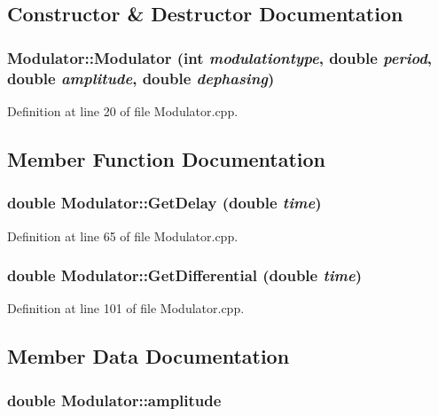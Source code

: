 \subsection{Constructor \& Destructor Documentation}
\hypertarget{classModulator_a9988f2b9041384d86b58fd8ff6a2ab30}{
\subsubsection[{Modulator}]{\setlength{\rightskip}{0pt plus 5cm}Modulator::Modulator (int {\em modulationtype}, \/  double {\em period}, \/  double {\em amplitude}, \/  double {\em dephasing})}}
\label{classModulator_a9988f2b9041384d86b58fd8ff6a2ab30}


Definition at line 20 of file Modulator.cpp.



\subsection{Member Function Documentation}
\hypertarget{classModulator_a10584ade4c8b9e10aaa78a8eed83261b}{
\subsubsection[{GetDelay}]{\setlength{\rightskip}{0pt plus 5cm}double Modulator::GetDelay (double {\em time})}}
\label{classModulator_a10584ade4c8b9e10aaa78a8eed83261b}


Definition at line 65 of file Modulator.cpp.

\hypertarget{classModulator_aed0bf37696c14ff9c4231993dfe306dd}{
\subsubsection[{GetDifferential}]{\setlength{\rightskip}{0pt plus 5cm}double Modulator::GetDifferential (double {\em time})}}
\label{classModulator_aed0bf37696c14ff9c4231993dfe306dd}


Definition at line 101 of file Modulator.cpp.



\subsection{Member Data Documentation}
\hypertarget{classModulator_a4c384ef6fe79785c8750710ae2dc5be6}{
\subsubsection[{amplitude}]{\setlength{\rightskip}{0pt plus 5cm}double {\bf Modulator::amplitude}}}
\label{classModulator_a4c384ef6fe79785c8750710ae2dc5be6}


